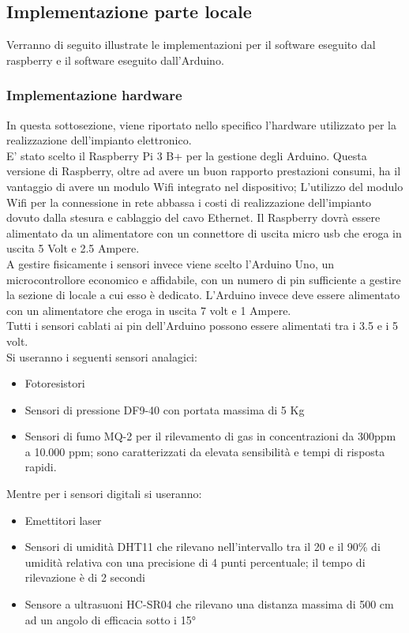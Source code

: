 \documentclass[12pt]{article}
\begin{document}
\subsection{Implementazione parte locale}
Verranno di seguito illustrate le implementazioni per il software eseguito dal raspberry e il software eseguito dall'Arduino.
\subsubsection{Implementazione hardware}
In questa sottosezione, viene riportato nello specifico l'hardware utilizzato per la realizzazione dell'impianto elettronico.\\
E' stato scelto il Raspberry Pi 3 B+ per la gestione degli Arduino. Questa versione di Raspberry, oltre ad avere un buon rapporto prestazioni consumi, ha il vantaggio di avere un modulo Wifi integrato nel dispositivo; L'utilizzo del modulo Wifi per la connessione in rete abbassa i costi di realizzazione dell'impianto dovuto dalla stesura e cablaggio del cavo Ethernet.
Il Raspberry dovrà essere alimentato da un alimentatore con un connettore di uscita micro usb che eroga in uscita 5 Volt e 2.5 Ampere.\\
A gestire fisicamente i sensori invece viene scelto l'Arduino Uno, un microcontrollore economico e affidabile, con un numero di pin sufficiente a gestire la sezione di locale a cui esso è dedicato. L'Arduino invece deve essere alimentato con un alimentatore che eroga in uscita 7 volt e 1 Ampere.\\
Tutti i sensori cablati ai pin dell'Arduino possono essere alimentati tra i 3.5 e i 5 volt.\\
Si useranno i seguenti sensori analagici:
\begin{itemize}
\item Fotoresistori
\item Sensori di pressione DF9-40 con portata massima di 5 Kg
\item Sensori di fumo MQ-2 per il rilevamento di gas in concentrazioni da 300ppm a 10.000 ppm; sono caratterizzati da elevata sensibilità e tempi di risposta rapidi.
\end{itemize}
Mentre per i sensori digitali si useranno:
\begin{itemize}
\item Emettitori laser
\item Sensori di umidità DHT11 che rilevano nell'intervallo tra il 20 e il 90\% di umidità relativa con una precisione di 4 punti percentuale; il tempo di rilevazione è di 2 secondi
\item Sensore a ultrasuoni HC-SR04 che rilevano una distanza massima di 500 cm ad un angolo di efficacia sotto i 15° 
\end{itemize}
\end{document}
